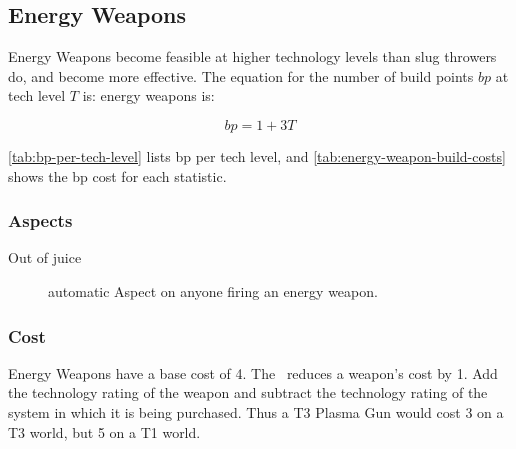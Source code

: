 \subsection{Energy Weapons}
\label{sec:energy-weapons}

Energy Weapons become feasible at higher technology levels than slug
throwers do, and become more effective. The equation for the number of build points $bp$ at tech level $T$ is:
energy weapons is:

\[ bp = 1 + 3T \]

\autoref{tab:bp-per-tech-level} lists bp per tech level, and \autoref{tab:energy-weapon-build-costs} shows the bp cost for each statistic.




\subsubsection{Aspects}
\begin{description}
\item[Out of juice]
automatic Aspect on anyone firing an energy weapon.
\end{description}

\subsubsection{Cost}

Energy Weapons have a base cost of 4. The  \Stunt\ reduces a weapon's cost by 1. Add the technology rating of the weapon and subtract the technology rating of the system in which it is being purchased. Thus a T3 Plasma Gun would cost 3 on a T3 world, but 5 on a T1 world.
